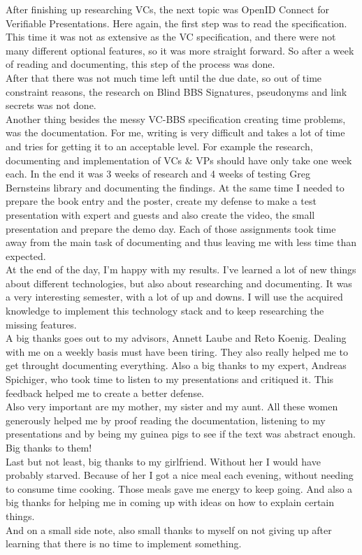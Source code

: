 \documentclass[
	a4paper               %
	,BCOR=0mm            %
	,bibliography=totoc   %
	,listof=totoc         %
	,monolingual
	,twoside=false
]{bfhthesis}              %
\begin{document}
After finishing up researching VCs, the next topic was OpenID Connect for Verifiable Presentations. Here again, the first step was to read the specification. This time it was not as extensive as the VC specification, and there were not many different optional features, so it was more straight forward. So after a week of reading and documenting, this step of the process was done. \\

\newpage
After that there was not much time left until the due date, so out of time constraint reasons, the research on Blind BBS Signatures, pseudonyms and link secrets was not done. \\

Another thing besides the messy VC-BBS specification creating time problems, was the documentation. For me, writing is very difficult and takes a lot of time and tries for getting it to an acceptable level. For example the research, documenting and implementation of VCs \& VPs should have only take one week each. In the end it was 3 weeks of research and 4 weeks of testing Greg Bernsteins library and documenting the findings. At the same time I needed to prepare the book entry and the poster, create my defense to make a test presentation with expert and guests and also create the video, the small presentation and prepare the demo day. Each of those assignments took time away from the main task of documenting and thus leaving me with less time than expected. \\

At the end of the day, I'm happy with my results. I've learned a lot of new things about different technologies, but also about researching and documenting. It was a very interesting semester, with a lot of up and downs. I will use the acquired knowledge to implement this technology stack and to keep researching the missing features.\\

A big thanks goes out to my advisors, Annett Laube and Reto Koenig. Dealing with me on a weekly basis must have been tiring. They also really helped me to get throught documenting everything. Also a big thanks to my expert, Andreas Spichiger, who took time to listen to my presentations and critiqued it. This feedback helped me to create a better defense.\\

Also very important are my mother, my sister and my aunt. All these women generously helped me by proof reading the documentation, listening to my presentations and by being my guinea pigs to see if the text was abstract enough. Big thanks to them!\\

Last but not least, big thanks to my girlfriend. Without her I would have probably starved. Because of her I got a nice meal each evening, without needing to consume time cooking. Those meals gave me energy to keep going. And also a big thanks for helping me in coming up with ideas on how to explain certain things.\\

And on a small side note, also small thanks to myself on not giving up after learning that there is no time to implement something.




\end{document}
